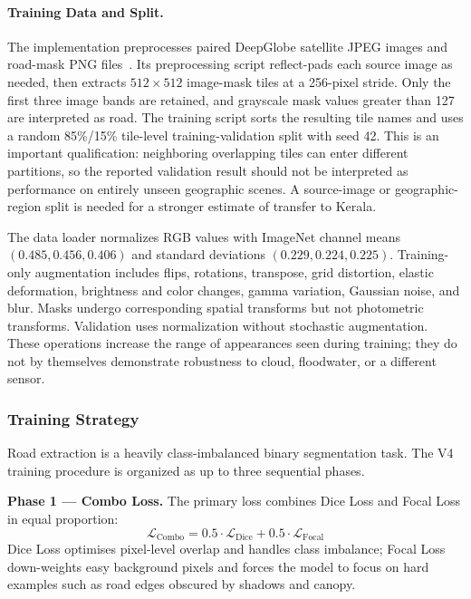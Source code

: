 \documentclass[10pt,a4paper,twocolumn]{article}
\begin{document}
\paragraph{Training Data and Split.}
The implementation preprocesses paired DeepGlobe satellite JPEG images and road-mask PNG files~\cite{b16}. Its preprocessing script reflect-pads each source image as needed, then extracts $512\times512$ image-mask tiles at a 256-pixel stride. Only the first three image bands are retained, and grayscale mask values greater than 127 are interpreted as road. The training script sorts the resulting tile names and uses a random 85\%/15\% tile-level training-validation split with seed 42. This is an important qualification: neighboring overlapping tiles can enter different partitions, so the reported validation result should not be interpreted as performance on entirely unseen geographic scenes. A source-image or geographic-region split is needed for a stronger estimate of transfer to Kerala.

The data loader normalizes RGB values with ImageNet channel means $(0.485,0.456,0.406)$ and standard deviations $(0.229,0.224,0.225)$. Training-only augmentation includes flips, rotations, transpose, grid distortion, elastic deformation, brightness and color changes, gamma variation, Gaussian noise, and blur. Masks undergo corresponding spatial transforms but not photometric transforms. Validation uses normalization without stochastic augmentation. These operations increase the range of appearances seen during training; they do not by themselves demonstrate robustness to cloud, floodwater, or a different sensor.

\subsubsection{Training Strategy}

Road extraction is a heavily class-imbalanced binary segmentation task.
The V4 training procedure is organized as up to three sequential phases.

\textbf{Phase 1 --- Combo Loss.} The primary loss combines Dice Loss
and Focal Loss in equal proportion:
\begin{equation}
\mathcal{L}_{\text{Combo}} = 0.5 \cdot \mathcal{L}_{\text{Dice}}
                            + 0.5 \cdot \mathcal{L}_{\text{Focal}}
\label{eq:combo}
\end{equation}
Dice Loss optimises pixel-level overlap and handles class imbalance;
Focal Loss down-weights easy background pixels and forces the model to
focus on hard examples such as road edges obscured by shadows and
canopy.
\end{document}
